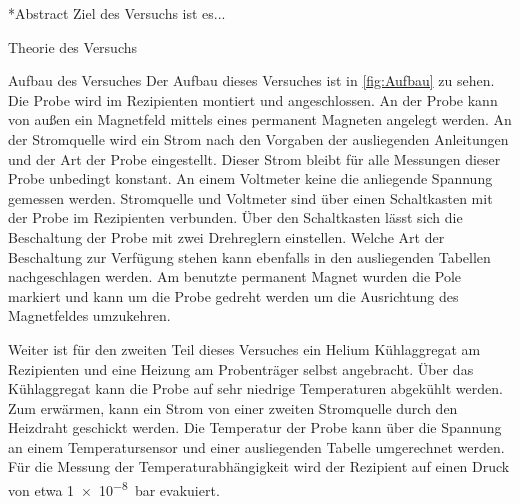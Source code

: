 \documentclass[pdftex, a4paper,11pt, twoside, ngerman]{report}
\begin{document}
  
  
  
  
  
  
  
  
  \begin{chapter}*{Abstract}
    Ziel des Versuchs ist es...
    
    
  \end{chapter}
  
  \tableofcontents
  
  
  
  \begin{chapter}{Theorie des Versuchs}
    \label{chp:Theorie}
    
    
    
  \end{chapter}
         
         
         
  \begin{chapter}{Aufbau des Versuches}
    \label{chp:Aufbau}
    Der Aufbau dieses Versuches ist in \cref{fig:Aufbau} zu sehen.
    Die Probe wird im Rezipienten montiert und angeschlossen.
    An der Probe kann von außen ein Magnetfeld mittels eines permanent Magneten
    angelegt werden. An der Stromquelle wird ein Strom nach den Vorgaben der
    ausliegenden Anleitungen und der Art der Probe eingestellt.
    Dieser Strom bleibt für alle Messungen dieser Probe unbedingt konstant.
    An einem Voltmeter keine die anliegende Spannung gemessen werden.
    Stromquelle und Voltmeter sind über einen Schaltkasten mit der Probe im
    Rezipienten verbunden.
    Über den Schaltkasten lässt sich die Beschaltung der Probe mit zwei
    Drehreglern einstellen.
    Welche Art der Beschaltung zur Verfügung stehen kann ebenfalls in den
    ausliegenden Tabellen nachgeschlagen werden.
    Am benutzte permanent Magnet wurden die Pole markiert und kann um die Probe
    gedreht werden um die Ausrichtung des Magnetfeldes umzukehren.
    
    Weiter ist für den zweiten Teil dieses Versuches ein Helium Kühlaggregat am
    Rezipienten und eine Heizung am Probenträger selbst angebracht.
    Über das Kühlaggregat kann die Probe auf sehr niedrige Temperaturen
    abgekühlt werden. Zum erwärmen, kann ein Strom von einer zweiten Stromquelle
    durch den Heizdraht geschickt werden. Die Temperatur der Probe kann über
    die Spannung an einem Temperatursensor und einer ausliegenden
    Tabelle umgerechnet werden.
    Für die Messung der Temperaturabhängigkeit wird der Rezipient auf einen
    Druck von etwa \SI{1e-8}{\bar} evakuiert.
    
    
  \end{chapter}
  
\end{document}
